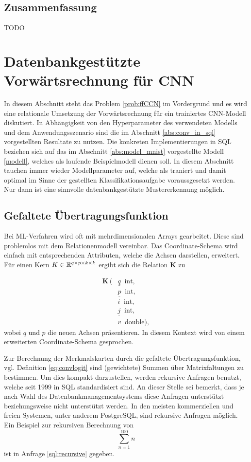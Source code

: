 \subsection{Zusammenfassung}
\label{abs:sum_conc_in_sql}
TODO

\section{Datenbankgestützte Vorwärtsrechnung für CNN}
\label{abs_CNN_in_SQL}
In diesem Abschnitt steht das Problem \ref{prob:ffCCN} im Vordergrund und es wird eine relationale Umsetzung der Vorwärtsrechnung für ein trainiertes CNN-Modell diskutiert. In Abhängigkeit von den Hyperparameter des verwendeten Modells und dem Anwendungsszenario sind die im Abschnitt \ref{abs:conv_in_sql} vorgestellten Resultate zu nutzen.    
Die konkreten Implementierungen in SQL beziehen sich auf das im Abschnitt \ref{abs:model_mnist} vorgestellte Modell \ref{modell}, welches als laufende Beispielmodell dienen soll. In diesem Abschnitt tauchen immer wieder Modellparameter auf, welche als traniert und damit optimal im Sinne der gestellten Klassifikationsaufgabe voraussgesetzt werden. Nur dann ist eine sinnvolle datenbankgestützte Mustererkennung möglich.  

\subsection*{Gefaltete Übertragungsfunktion}
Bei ML-Verfahren wird oft mit mehrdimensionalen Arrays gearbeitet. Diese sind problemlos mit dem Relationenmodell vereinbar. Das Coordinate-Schema wird einfach mit entsprechenden Attributen, welche die Achsen darstellen, erweitert. Für einen Kern $K \in \mathbb{R}^{q \times p \times k \times k}$ ergibt sich die Relation \textbf{K} zu

\begin{align*}
    \mathbf{K}\, ( 
    &\underline{q} \; \; \mathrm{int},\\
    &\underline{p} \; \; \mathrm{int},\\
    &\underline{i} \; \; \mathrm{int}, \\    
    &\underline{j} \; \; \mathrm{int}, \\
    &v \; \; \mathrm{double}),
\end{align*}
wobei $q$ und $p$ die neuen Achsen präsentieren. In diesem Kontext wird von einem erweiterten Coordinate-Schema gesprochen.

Zur Berechnung der Merkmalskarten durch die gefaltete Übertragungsfunktion, vgl. Definition \ref{eq:convlogit} sind (gewichtete) Summen über Matrixfaltungen zu bestimmen. Um dies kompakt darzustellen, werden rekursive Anfragen benutzt, welche seit 1999 in SQL standardisiert sind. An dieser Stelle sei bemerkt, dass je nach Wahl des Datenbankmanagementsystems diese Anfragen unterstützt beziehungsweise nicht unterstützt werden. In den meisten kommerziellen und freien Systemen, unter anderem PostgreSQL, sind rekursive Anfragen möglich. Ein Beispiel zur rekursiven Berechnung von
\begin{equation}
   \label{eq:sum_n}
\sum_{n=1}^{100} n    
\end{equation} 
ist in Anfrage \ref{sql:recursive} gegeben. 

